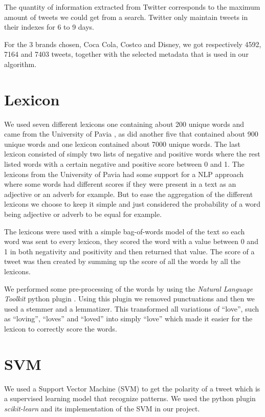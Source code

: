 \documentclass[a4paper,12pt]{report}
\begin{document}
The quantity of information extracted from Twitter corresponds to the maximum amount of tweets we could get from a search.
Twitter only maintain tweets in their indexes for 6 to 9 days.

For the 3 brands chosen, Coca Cola, Costco and Disney, we got respectively 4592, 7164 and 7403 tweets, together with the selected metadata that is used in our algorithm.

\section{Lexicon}

We used seven different lexicons one containing about 200 unique words and came from the University of Pavia \cite{WNOP}, as did another five that contained about 900 unique words and one lexicon contained about 7000 unique words. 
The last lexicon consisted of simply two lists of negative and positive words where the rest listed words with a certain negative and positive score between 0 and 1. 
The lexicons from the University of Pavia had some support for a NLP approach where some words had different scores if they were present in a text as an adjective or an adverb for example.  
But to ease the aggregation of the different lexicons we choose to keep it simple and just considered the probability of a word being adjective or adverb to be equal for example.

The lexicons were used with a simple bag-of-words model of the text so each word was sent to every lexicon, they scored the word with a value between 0 and 1 in both negativity and positivity and then returned that value. 
The score of a tweet was then created by summing up the score of all the words by all the lexicons.

We performed some pre-processing of the words by using the \textit{Natural Language Toolkit} python plugin \cite{NLTK}.
Using this plugin we removed punctuations and then we used a stemmer and a lemmatizer. This transformed all variations of ``love'', such as ``loving'', ``loves'' and ``loved'' into simply ``love'' which made it easier for the lexicon to correctly score the words.

\section{SVM}

We used a Support Vector Machine (SVM) to get the polarity of a tweet which is a supervised learning model that recognize patterns. We used the python plugin \textit{scikit-learn}\cite{Scikit} and its implementation of the SVM in our project.
\end{document}
